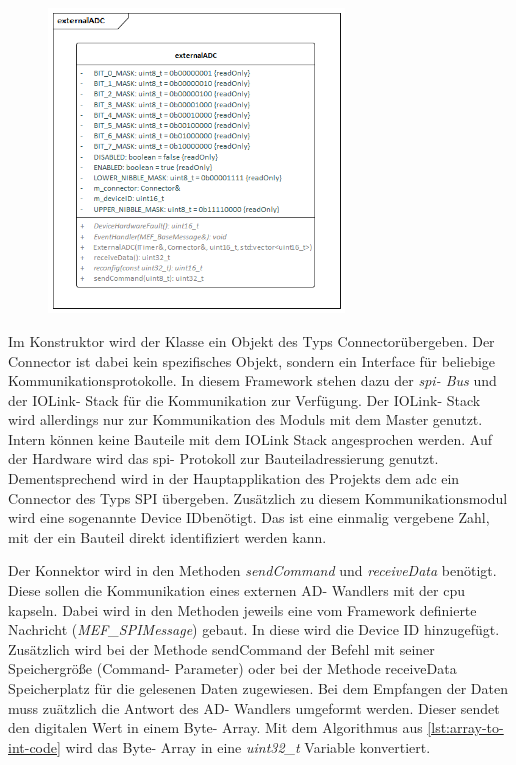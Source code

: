 \begin{figure}[!htb]
    \begin{center}
        \includegraphics[width=0.7\textwidth]{Figures/Chapter_3/externer_adc.png}
        
        \label{fig:external-adc}
    \end {center}
\end{figure}

Im Konstruktor wird der Klasse ein Objekt des Typs \glqq Connector\grqq übergeben.
Der Connector ist dabei kein spezifisches Objekt, sondern ein Interface für beliebige Kommunikationsprotokolle.
In diesem Framework stehen dazu der \textit{\ac{spi}- Bus} und der IOLink- Stack für die Kommunikation zur Verfügung.
Der IOLink- Stack wird allerdings nur zur Kommunikation des Moduls mit dem Master genutzt.
Intern können keine Bauteile mit dem IOLink Stack angesprochen werden.
Auf der Hardware wird das \ac{spi}- Protokoll zur Bauteiladressierung genutzt.
Dementsprechend wird in der Hauptapplikation des Projekts dem \ac{adc} ein Connector des Typs SPI übergeben.\newline
Zusätzlich zu diesem Kommunikationsmodul wird eine sogenannte \glqq Device ID\grqq benötigt.
Das ist eine einmalig vergebene Zahl, mit der ein Bauteil direkt identifiziert werden kann.

Der Konnektor wird in den Methoden \textit{sendCommand} und \textit{receiveData} benötigt.
Diese sollen die Kommunikation eines externen AD- Wandlers mit der \ac{cpu} kapseln.
Dabei wird in den Methoden jeweils eine vom Framework definierte Nachricht (\textit{MEF\_SPIMessage}) gebaut.
In diese wird die Device ID hinzugefügt.
Zusätzlich wird bei der Methode sendCommand der Befehl mit seiner Speichergröße (Command- Parameter) oder bei der Methode receiveData Speicherplatz für die gelesenen Daten zugewiesen.
Bei dem Empfangen der Daten muss zuätzlich die Antwort des AD- Wandlers umgeformt werden.
Dieser sendet den digitalen Wert in einem Byte- Array.
Mit dem Algorithmus aus \autoref{lst:array-to-int-code} wird das Byte- Array in eine \textit{uint32\_t} Variable konvertiert.

